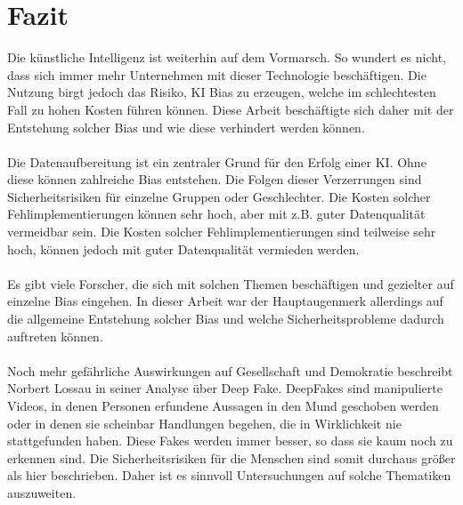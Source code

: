 \documentclass[12pt,oneside,a4paper,parskip]{scrbook}
\begin{document}
\chapter{Fazit}
Die künstliche Intelligenz ist weiterhin auf dem Vormarsch. So wundert es nicht, dass sich immer mehr Unternehmen mit dieser Technologie beschäftigen. Die Nutzung birgt jedoch das Risiko, KI Bias zu erzeugen, welche im schlechtesten Fall zu hohen Kosten führen können. Diese Arbeit beschäftigte sich daher mit der Entstehung solcher Bias und wie diese verhindert werden können.
\\\\
Die Datenaufbereitung ist ein zentraler Grund für den Erfolg einer KI. Ohne diese können zahlreiche Bias entstehen. Die Folgen dieser Verzerrungen sind Sicherheitsrisiken für einzelne Gruppen oder Geschlechter. Die Kosten solcher Fehlimplementierungen können sehr hoch, aber mit z.B. guter Datenqualität vermeidbar sein.
Die Kosten solcher Fehlimplementierungen sind teilweise sehr hoch, können jedoch mit guter Datenqualität vermieden werden.
\\\\
Es gibt viele Forscher, die sich mit solchen Themen beschäftigen und gezielter auf einzelne Bias eingehen. In dieser Arbeit war der Hauptaugenmerk allerdings auf die allgemeine Entstehung solcher Bias und welche Sicherheitsprobleme dadurch auftreten können.
\\\\
Noch mehr gefährliche Auswirkungen auf Gesellschaft und Demokratie beschreibt Norbert Lossau in seiner Analyse über Deep Fake\cite{deepFake}. DeepFakes sind manipulierte Videos, in denen Personen erfundene Aussagen in den Mund geschoben werden oder in denen sie scheinbar Handlungen begehen, die in Wirklichkeit nie stattgefunden haben. Diese Fakes werden immer besser, so dass sie kaum noch zu erkennen sind. Die Sicherheitsrisiken für die Menschen sind somit durchaus größer als hier beschrieben. Daher ist es sinnvoll Untersuchungen auf solche Thematiken auszuweiten.

\backmatter


\cleardoublepage
{}
{}
\printbibliography
\end{document}
